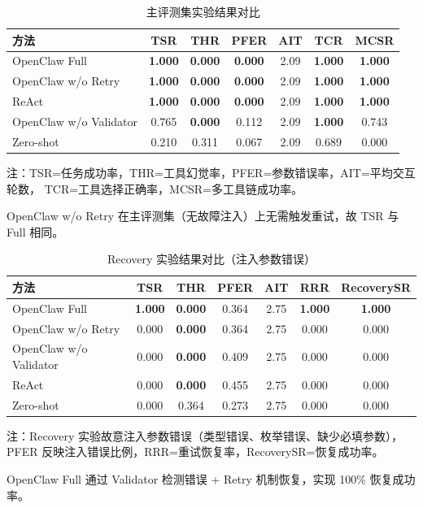 \begin{table}[htbp]
\centering
\caption{主评测集实验结果对比}
\label{tab:main_results}
\begin{tabular}{lcccccc}
\toprule
\textbf{方法} & \textbf{TSR} & \textbf{THR} & \textbf{PFER} & \textbf{AIT} & \textbf{TCR} & \textbf{MCSR} \\
\midrule
OpenClaw Full & \textbf{1.000} & \textbf{0.000} & \textbf{0.000} & 2.09 & \textbf{1.000} & \textbf{1.000} \\
OpenClaw w/o Retry & \textbf{1.000} & \textbf{0.000} & \textbf{0.000} & 2.09 & \textbf{1.000} & \textbf{1.000} \\
ReAct & \textbf{1.000} & \textbf{0.000} & \textbf{0.000} & 2.09 & \textbf{1.000} & \textbf{1.000} \\
OpenClaw w/o Validator & 0.765 & \textbf{0.000} & 0.112 & 2.09 & \textbf{1.000} & 0.743 \\
Zero-shot & 0.210 & 0.311 & 0.067 & 2.09 & 0.689 & 0.000 \\
\bottomrule
\end{tabular}
\begin{tablenotes}
\small
\item 注：TSR=任务成功率，THR=工具幻觉率，PFER=参数错误率，AIT=平均交互轮数，
       TCR=工具选择正确率，MCSR=多工具链成功率。
\item OpenClaw w/o Retry 在主评测集（无故障注入）上无需触发重试，故 TSR 与 Full 相同。
\end{tablenotes}
\end{table}

\begin{table}[htbp]
\centering
\caption{Recovery 实验结果对比（注入参数错误）}
\label{tab:recovery_results}
\begin{tabular}{lcccccc}
\toprule
\textbf{方法} & \textbf{TSR} & \textbf{THR} & \textbf{PFER} & \textbf{AIT} & \textbf{RRR} & \textbf{RecoverySR} \\
\midrule
OpenClaw Full & \textbf{1.000} & \textbf{0.000} & 0.364 & 2.75 & \textbf{1.000} & \textbf{1.000} \\
OpenClaw w/o Retry & 0.000 & \textbf{0.000} & 0.364 & 2.75 & 0.000 & 0.000 \\
OpenClaw w/o Validator & 0.000 & \textbf{0.000} & 0.409 & 2.75 & 0.000 & 0.000 \\
ReAct & 0.000 & \textbf{0.000} & 0.455 & 2.75 & 0.000 & 0.000 \\
Zero-shot & 0.000 & 0.364 & 0.273 & 2.75 & 0.000 & 0.000 \\
\bottomrule
\end{tabular}
\begin{tablenotes}
\small
\item 注：Recovery 实验故意注入参数错误（类型错误、枚举错误、缺少必填参数），
       PFER 反映注入错误比例，RRR=重试恢复率，RecoverySR=恢复成功率。
\item OpenClaw Full 通过 Validator 检测错误 + Retry 机制恢复，实现 100\% 恢复成功率。
\end{tablenotes}
\end{table}

